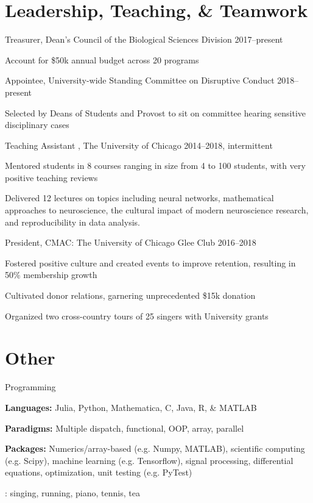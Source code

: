 \documentclass[]{friggeri-cv} %
\begin{document}
\section{Leadership, Teaching, \& Teamwork}
\begin{entrylist}
\entry
{Treasurer{\normalfont , Dean's Council of the Biological Sciences Division}}
{2017--present}
{
\item Account for \$50k annual budget across 20 programs}
\entry
{Appointee{\normalfont , University-wide Standing Committee on Disruptive Conduct}}
{2018--present}
{\item Selected by Deans of Students and Provost to sit on committee hearing sensitive disciplinary cases}
\entry
{Teaching Assistant {\normalfont , The University of Chicago}}
{2014--2018, intermittent}
{	\item Mentored students in 8 courses ranging in size from 4 to 100 students, with very positive teaching reviews
	\item Delivered 12 lectures on topics including neural networks,  mathematical approaches to neuroscience, the cultural impact of modern neuroscience research, and reproducibility in data analysis.
}
\entry
{President{\normalfont , CMAC: The University of Chicago Glee Club}}
{2016--2018}
{%
\item Fostered positive culture and created events to improve retention, resulting in 50\% membership growth
\item Cultivated donor relations, garnering unprecedented \$15k donation
\item Organized two cross-country tours of 25 singers with University grants
}
\end{entrylist}

\section{Other}
\begin{entrylist}
\entry
{Programming}
{}
{%
\item[] \textbf{Languages:} Julia, Python, Mathematica, C, Java, R, \& MATLAB
\item[] \textbf{Paradigms:} Multiple dispatch, functional, OOP, array, parallel
\item[] \textbf{Packages:} Numerics/array-based (e.g. Numpy, MATLAB), scientific computing (e.g. Scipy), machine learning (e.g. Tensorflow), signal processing, differential equations, optimization, unit testing (e.g. PyTest)
}
{}
{: singing, running, piano, tennis, tea}%
\end{entrylist}%
\end{document}
